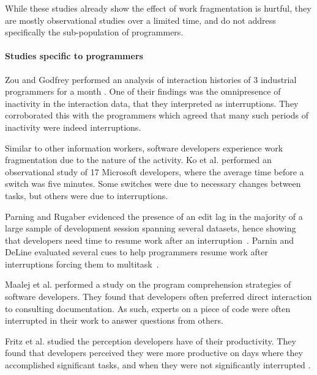 \documentclass[conference]{IEEEtran}
\begin{document}
While these studies already show the effect of work fragmentation is hurtful, they are mostly observational studies over a limited time, and do not address specifically the sub-population of programmers.

\paragraph{Studies specific to programmers}



Zou and Godfrey performed an analysis of interaction histories of 3 industrial programmers for a month \cite{ZG06}. One of their findings was the omnipresence of inactivity in the interaction data, that they interpreted as interruptions. They corroborated this with the programmers which agreed that many such periods of inactivity were indeed interruptions.

Similar to other information workers, software developers experience work fragmentation due to the nature of the activity. Ko et al. \cite{KDV07} performed an observational study of 17 Microsoft developers, where the average time before a switch was five minutes. Some switches were due to necessary changes between tasks, but others were
due to interruptions. 

Parning and Rugaber evidenced the presence of an edit lag in the majority of a large sample of development session spanning several datasets, hence showing that developers need time to resume work after an interruption~\cite{PR11}. Parnin and DeLine evaluated several cues  to help programmers resume work after interruptions forcing them to multitask~\cite{PD10}.

Maalej et al. \cite{MTRK14} performed a study on the program comprehension strategies of software developers. They found that developers often preferred direct interaction to consulting documentation. As such, experts on a piece of code were often interrupted in their work to answer questions from others.

Fritz et al. studied the perception developers have of their productivity. They found that developers perceived they were more productive on days where they accomplished significant tasks, and when they were not significantly interrupted \cite{MFMZ14}.
\end{document}
